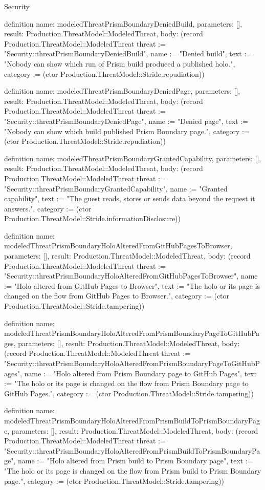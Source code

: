 \begin{lexlean}{Security}
\begin{semanticmodule}
definition{
  name: modeledThreatPrismBoundaryDeniedBuild,
  parameters: [],
  result: Production.ThreatModel::ModeledThreat,
  body: (record Production.ThreatModel::ModeledThreat {threat := "Security::threatPrismBoundaryDeniedBuild", name := "Denied build", text := "Nobody can show which run of Prism build produced a published holo.", category := (ctor Production.ThreatModel::Stride.repudiation)})
}

definition{
  name: modeledThreatPrismBoundaryDeniedPage,
  parameters: [],
  result: Production.ThreatModel::ModeledThreat,
  body: (record Production.ThreatModel::ModeledThreat {threat := "Security::threatPrismBoundaryDeniedPage", name := "Denied page", text := "Nobody can show which build published Prism Boundary page.", category := (ctor Production.ThreatModel::Stride.repudiation)})
}

definition{
  name: modeledThreatPrismBoundaryGrantedCapability,
  parameters: [],
  result: Production.ThreatModel::ModeledThreat,
  body: (record Production.ThreatModel::ModeledThreat {threat := "Security::threatPrismBoundaryGrantedCapability", name := "Granted capability", text := "The guest reads, stores or sends data beyond the request it answers.", category := (ctor Production.ThreatModel::Stride.informationDisclosure)})
}

definition{
  name: modeledThreatPrismBoundaryHoloAlteredFromGitHubPagesToBrowser,
  parameters: [],
  result: Production.ThreatModel::ModeledThreat,
  body: (record Production.ThreatModel::ModeledThreat {threat := "Security::threatPrismBoundaryHoloAlteredFromGitHubPagesToBrowser", name := "Holo altered from GitHub Pages to Browser", text := "The holo or its page is changed on the flow from GitHub Pages to Browser.", category := (ctor Production.ThreatModel::Stride.tampering)})
}

definition{
  name: modeledThreatPrismBoundaryHoloAlteredFromPrismBoundaryPageToGitHubPages,
  parameters: [],
  result: Production.ThreatModel::ModeledThreat,
  body: (record Production.ThreatModel::ModeledThreat {threat := "Security::threatPrismBoundaryHoloAlteredFromPrismBoundaryPageToGitHubPages", name := "Holo altered from Prism Boundary page to GitHub Pages", text := "The holo or its page is changed on the flow from Prism Boundary page to GitHub Pages.", category := (ctor Production.ThreatModel::Stride.tampering)})
}

definition{
  name: modeledThreatPrismBoundaryHoloAlteredFromPrismBuildToPrismBoundaryPage,
  parameters: [],
  result: Production.ThreatModel::ModeledThreat,
  body: (record Production.ThreatModel::ModeledThreat {threat := "Security::threatPrismBoundaryHoloAlteredFromPrismBuildToPrismBoundaryPage", name := "Holo altered from Prism build to Prism Boundary page", text := "The holo or its page is changed on the flow from Prism build to Prism Boundary page.", category := (ctor Production.ThreatModel::Stride.tampering)})
}


\end{semanticmodule}
\end{lexlean}

